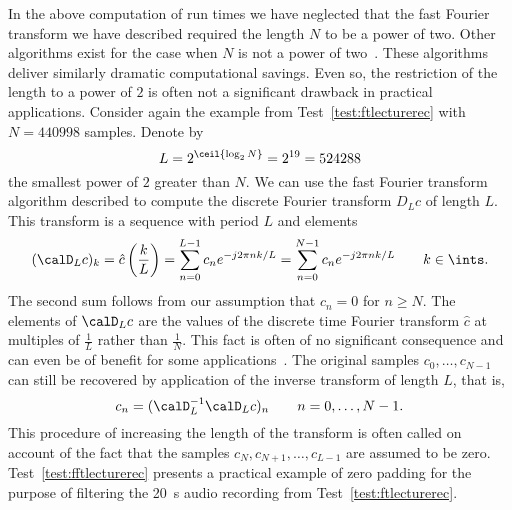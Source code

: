 In the above computation of run times we have neglected that the fast Fourier transform we have described required the length $N$ to be a power of two.  Other algorithms exist for the case when $N$ is not a power of two~\citep{Rader_fft_prime_1968,Bluestein_fft_prime_1968,FrigoJohnson_fftw_2005}.  These algorithms deliver similarly dramatic computational savings.  Even so, the restriction of the length to a power of $2$ is often not a significant drawback in practical applications.  Consider again the example from Test~\ref{test:ftlecturerec} with $N=440998$ samples.  Denote by 
\[
L = 2^{\ceil{\log_2 N}} = 2^{19} = 524288
\] 
the smallest power of $2$ greater than $N$.  We can use the fast Fourier transform algorithm described to compute the discrete Fourier transform $D_L c$ of length $L$.  This transform is a sequence with period $L$ and elements 
\[
(\calD_L c)_k = \hat{c}\left(\frac{k}{L}\right) = \sum_{n = 0}^{L-1} c_n e^{-j 2\pi n k/L} = \sum_{n = 0}^{N-1} c_n e^{-j 2\pi n k/L} \qquad k \in \ints.
\]
The second sum follows from our assumption that $c_n = 0$ for $n \geq N$.  The elements of $\calD_L c$ are the values of the discrete time Fourier transform $\hat{c}$ at multiples of $\tfrac{1}{L}$ rather than $\tfrac{1}{N}$.  This fact is often of no significant consequence and can even be of benefit for some applications~\citep{Quinn2001,Quinn2008maximizing_the_periodogram}.  The original samples $c_0, \dots, c_{N-1}$ can still be recovered by application of the inverse transform of length $L$, that is, 
\[
c_n = (\calD_L^{-1} \calD_L c)_n \qquad  n = 0, \dots, N-1.
\]  
This procedure of increasing the length of the transform is often called  on account of the fact that the samples $c_N, c_{N+1}, \dots, c_{L-1}$ are assumed to be zero.  Test~\ref{test:fftlecturerec} presents a practical example of zero padding for the purpose of filtering the \SI{20}{\second} audio recording from Test~\ref{test:ftlecturerec}.


